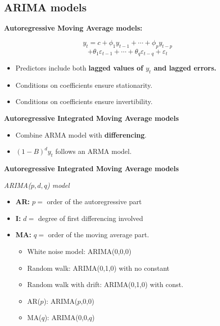 \documentclass[]{book}
\providecommand{\tightlist}{%
  \setlength{\itemsep}{0pt}\setlength{\parskip}{0pt}}
\begin{document}
\hypertarget{arima-models-1}{%
\subsection{ARIMA models}\label{arima-models-1}}

\textbf{Autoregressive Moving Average models:}

\[y_{t} = c + \phi_{1}y_{t - 1} + \cdots + \phi_{p}y_{t - p}\]
\[+ \theta_{1}\varepsilon_{t - 1} + \cdots + \theta_{q}\varepsilon_{t - q} + \varepsilon_{t}\]

\begin{itemize}
\tightlist
\item
  Predictors include both \textbf{lagged values of \(y_t\) and lagged errors.}
\item
  Conditions on coefficients ensure stationarity.
\item
  Conditions on coefficients ensure invertibility.
\end{itemize}

\textbf{Autoregressive Integrated Moving Average models}

\begin{itemize}
\tightlist
\item
  Combine ARMA model with \textbf{differencing}.
\item
  \((1-B)^d y_t\) follows an ARMA model.
\end{itemize}

\textbf{Autoregressive Integrated Moving Average models}

\emph{ARIMA(\(p, d, q\)) model}

\begin{itemize}
\item
  \textbf{AR:} \(p =\) order of the autoregressive part
\item
  \textbf{I:} \(d =\) degree of first differencing involved
\item
  \textbf{MA:} \(q =\) order of the moving average part.

  \begin{itemize}
  \tightlist
  \item
    White noise model: ARIMA(0,0,0)
  \item
    Random walk: ARIMA(0,1,0) with no constant
  \item
    Random walk with drift: ARIMA(0,1,0) with const.
  \item
    AR(\(p\)): ARIMA(\(p\),0,0)
  \item
    MA(\(q\)): ARIMA(0,0,\(q\))
  \end{itemize}
\end{itemize}
\end{document}

